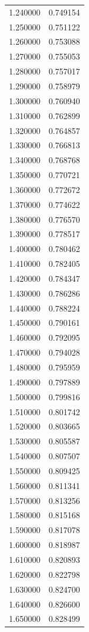 \begin{tabular}{rr}
1.240000 & 0.749154 \\
1.250000 & 0.751122 \\
1.260000 & 0.753088 \\
1.270000 & 0.755053 \\
1.280000 & 0.757017 \\
1.290000 & 0.758979 \\
1.300000 & 0.760940 \\
1.310000 & 0.762899 \\
1.320000 & 0.764857 \\
1.330000 & 0.766813 \\
1.340000 & 0.768768 \\
1.350000 & 0.770721 \\
1.360000 & 0.772672 \\
1.370000 & 0.774622 \\
1.380000 & 0.776570 \\
1.390000 & 0.778517 \\
1.400000 & 0.780462 \\
1.410000 & 0.782405 \\
1.420000 & 0.784347 \\
1.430000 & 0.786286 \\
1.440000 & 0.788224 \\
1.450000 & 0.790161 \\
1.460000 & 0.792095 \\
1.470000 & 0.794028 \\
1.480000 & 0.795959 \\
1.490000 & 0.797889 \\
1.500000 & 0.799816 \\
1.510000 & 0.801742 \\
1.520000 & 0.803665 \\
1.530000 & 0.805587 \\
1.540000 & 0.807507 \\
1.550000 & 0.809425 \\
1.560000 & 0.811341 \\
1.570000 & 0.813256 \\
1.580000 & 0.815168 \\
1.590000 & 0.817078 \\
1.600000 & 0.818987 \\
1.610000 & 0.820893 \\
1.620000 & 0.822798 \\
1.630000 & 0.824700 \\
1.640000 & 0.826600 \\
1.650000 & 0.828499 \\

\end{tabular}

